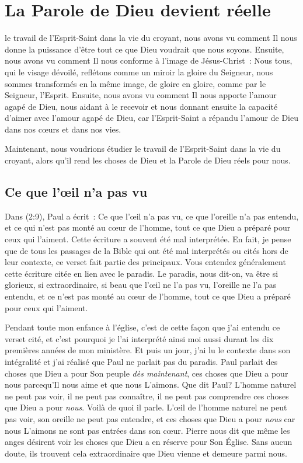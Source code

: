 \chapter{La Parole de Dieu devient réelle}

 le travail de l'Esprit-Saint
 dans la vie du croyant, nous avons vu comment Il nous donne la puissance
 d'être tout ce que Dieu voudrait que nous soyons.
 Ensuite, nous avons vu comment Il nous conforme à l'image de Jésus-Christ~:
 \og Nous tous, qui le visage dévoilé, reflétons comme un miroir la gloire
 du Seigneur, nous sommes transformés en la même image, de gloire en gloire,
 comme par le Seigneur, l'Esprit. \fg{}
 Ensuite, nous avons vu comment Il nous apporte l'amour agapé de Dieu,
 nous aidant à le recevoir et nous donnant ensuite la capacité d'aimer
 avec l'amour agapé de Dieu, car l'Esprit-Saint a répandu l'amour de Dieu
 dans nos cœurs et dans nos vies.

Maintenant, nous voudrions étudier le travail de l'Esprit-Saint dans la vie
 du croyant, alors qu'il rend les choses de Dieu et la Parole de Dieu
 réels pour nous.


\section*{Ce que l'œil n'a pas vu}

Dans (2:9), Paul a écrit~:
 \og Ce que l'œil n'a pas vu, ce que l'oreille n'a pas entendu,
 et ce qui n'est pas monté au cœur de l'homme, tout ce que Dieu
 a préparé pour ceux qui l'aiment. \fg{}
 Cette écriture a souvent été mal interprétée. En fait,
 je pense que de tous les passages de la Bible qui ont été mal interprétés
 ou cités hors de leur contexte, ce verset fait partie des principaux.
 Vous entendez généralement cette écriture citée en lien avec le paradis.
 Le paradis, nous dit-on, va être si glorieux, si extraordinaire,
 si beau que \og l'œil ne l'a pas vu, l'oreille ne l'a pas entendu,
 et ce n'est pas monté au cœur de l'homme, tout ce que Dieu a préparé
 pour ceux qui l'aiment. \fg{}

Pendant toute mon enfance à l'église, c'est de cette façon que j'ai entendu
 ce verset cité, et c'est pourquoi je l'ai interprété ainsi moi aussi
 durant les dix premières années de mon ministère.
 Et puis un jour, j'ai lu le contexte dans son intégralité et j'ai réalisé
 que Paul ne parlait pas du paradis. Paul parlait des choses que Dieu
 a pour Son peuple \emph{dès maintenant},
 ces choses que Dieu a pour nous parcequ'Il
 nous aime et que nous L'aimons. Que dit Paul?
 L'homme naturel ne peut pas voir, il ne peut pas connaître,
 il ne peut pas comprendre ces choses que Dieu a pour \emph{nous}.
 Voilà de quoi il parle. L'œil de l'homme naturel ne peut pas voir,
 son oreille ne peut pas entendre, et ces choses que Dieu a pour \emph{nous}
 car nous L'aimons ne sont pas entrées dans son cœur.
 Pierre nous dit que même les anges désirent voir les choses que Dieu
 a en réserve pour Son Église.
 Sans aucun doute, ils trouvent cela extraordinaire que Dieu vienne
 et demeure parmi nous.


